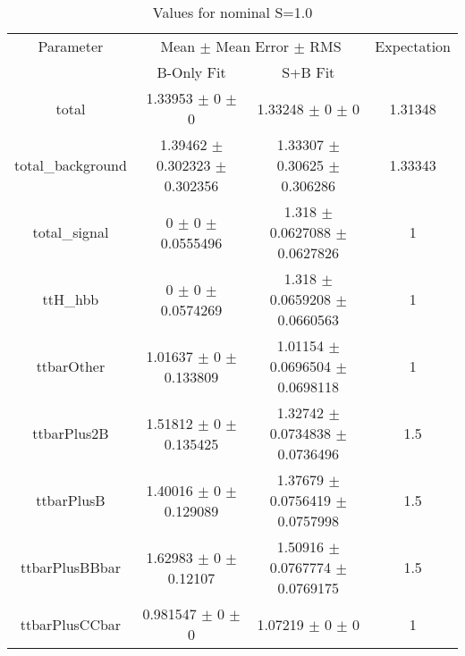\begin{table}
\centering
\caption{Values for nominal S=1.0}
\begin{tabular}{cccc}
\toprule
Parameter & \multicolumn{2}{c}{Mean $\pm$ Mean Error $\pm$ RMS} & Expectation\\
 & B-Only Fit & S+B Fit & \\
\midrule
total & \num{1.33953} $\pm$ \num{0} $\pm$ \num{0} & \num{1.33248} $\pm$ \num{0} $\pm$ \num{0} & \num{1.31348}\\
total\_background & \num{1.39462} $\pm$ \num{0.302323} $\pm$ \num{0.302356} & \num{1.33307} $\pm$ \num{0.30625} $\pm$ \num{0.306286} & \num{1.33343}\\
total\_signal & \num{0} $\pm$ \num{0} $\pm$ \num{0.0555496} & \num{1.318} $\pm$ \num{0.0627088} $\pm$ \num{0.0627826} & \num{1}\\
ttH\_hbb & \num{0} $\pm$ \num{0} $\pm$ \num{0.0574269} & \num{1.318} $\pm$ \num{0.0659208} $\pm$ \num{0.0660563} & \num{1}\\
ttbarOther & \num{1.01637} $\pm$ \num{0} $\pm$ \num{0.133809} & \num{1.01154} $\pm$ \num{0.0696504} $\pm$ \num{0.0698118} & \num{1}\\
ttbarPlus2B & \num{1.51812} $\pm$ \num{0} $\pm$ \num{0.135425} & \num{1.32742} $\pm$ \num{0.0734838} $\pm$ \num{0.0736496} & \num{1.5}\\
ttbarPlusB & \num{1.40016} $\pm$ \num{0} $\pm$ \num{0.129089} & \num{1.37679} $\pm$ \num{0.0756419} $\pm$ \num{0.0757998} & \num{1.5}\\
ttbarPlusBBbar & \num{1.62983} $\pm$ \num{0} $\pm$ \num{0.12107} & \num{1.50916} $\pm$ \num{0.0767774} $\pm$ \num{0.0769175} & \num{1.5}\\
ttbarPlusCCbar & \num{0.981547} $\pm$ \num{0} $\pm$ \num{0} & \num{1.07219} $\pm$ \num{0} $\pm$ \num{0} & \num{1}\\
\bottomrule
\end{tabular}
\end{table}